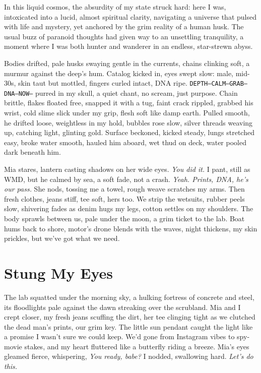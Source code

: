 \documentclass[12pt,oneside]{book}
\newcommand{\note}[1]{\texttt{#1}}
\begin{document}
In this liquid cosmos, the absurdity of my state struck hard: here I was, intoxicated into a lucid, almost spiritual clarity, navigating a universe that pulsed with life and mystery, yet anchored by the grim reality of a human husk. The usual buzz of paranoid thoughts had given way to an unsettling tranquility, a moment where I was both hunter and wanderer in an endless, star-strewn abyss.

Bodies drifted, pale husks swaying gentle in the currents, chains clinking soft, a murmur against the deep’s hum. Catalog kicked in, eyes swept slow: male, mid-30s, skin taut but mottled, fingers curled intact, DNA ripe. \note{DEPTH—CALM—GRAB—DNA—NOW—} purred in my skull, a quiet chant, no scream, just purpose. Chain brittle, flakes floated free, snapped it with a tug, faint crack rippled, grabbed his wrist, cold slime slick under my grip, flesh soft like damp earth. Pulled smooth, he drifted loose, weightless in my hold, bubbles rose slow, silver threads weaving up, catching light, glinting gold. Surface beckoned, kicked steady, lungs stretched easy, broke water smooth, hauled him aboard, wet thud on deck, water pooled dark beneath him.

Mia stares, lantern casting shadows on her wide eyes. \textit{You did it.} I pant, still as WMD, but he calmed by sea, a soft fade, not a crash. \textit{Yeah. Prints, DNA, he’s our pass.} She nods, tossing me a towel, rough weave scratches my arms. Then fresh clothes, jeans stiff, tee soft, hers too. We strip the wetsuits, rubber peels slow, shivering fades as denim hugs my legs, cotton settles on my shoulders. The body sprawls between us, pale under the moon, a grim ticket to the lab. Boat hums back to shore, motor’s drone blends with the waves, night thickens, my skin prickles, but we’ve got what we need.

\chapter{Stung My Eyes}

The lab squatted under the morning sky, a hulking fortress of concrete and steel, its floodlights pale against the dawn streaking over the scrubland. Mia and I crept closer, my fresh jeans scuffing the dirt, her tee clinging tight as we clutched the dead man’s prints, our grim key. The little sun pendant caught the light like a promise I wasn’t sure we could keep. We’d gone from Instagram vibes to spy-movie stakes, and my heart fluttered like a butterfly riding a breeze. Mia’s eyes gleamed fierce, whispering, \textit{You ready, babe?} I nodded, swallowing hard. \textit{Let’s do this.}
\end{document}
